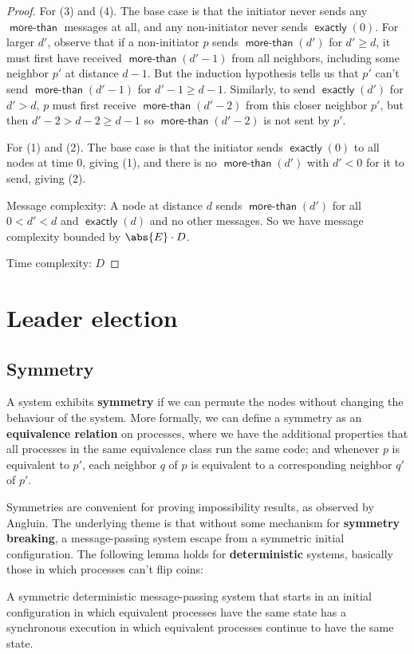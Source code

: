 \documentclass[11pt]{article}
\DeclareMathOperator{\exactly}{\textsf{exactly}}
\DeclareMathOperator{\morethan}{\textsf{more-than}}
\begin{document}
\begin{proof}
For (3) and (4). The base case is that the initiator never sends any \(\morethan\) messages at all,
and any non-initiator never sends \(\exactly(0)\). For larger \(d'\), observe that if a non-initiator
\(p\) sends \(\morethan(d')\) for \(d'\ge d\), it must first have received \(\morethan(d'-1)\) from all
neighbors, including some neighbor \(p'\) at distance \(d-1\). But the induction hypothesis tells us
that \(p'\) can't send \(\morethan(d'-1)\) for \(d'-1\ge d-1\). Similarly, to send \(\exactly(d')\) for
\(d'>d\), \(p\) must first receive \(\morethan(d'-2)\) from this closer neighbor \(p'\), but then
\(d'-2>d-2\ge d-1\) so \(\morethan(d'-2)\) is not sent by \(p'\).

For (1) and (2). The base case is that the initiator sends \(\exactly(0)\) to all nodes at time 0,
giving (1), and there is no \(\morethan(d')\) with \(d'<0\) for it to send, giving (2).

Message complexity: A node at distance \(d\) sends \(\morethan(d')\) for all \(0<d'<d\) and
\(\exactly(d)\) and no other messages. So we have message complexity bounded by \(\abs{E}\cdot D\).

Time complexity: \(D\)
\end{proof}
\section{Leader election}
\label{sec:org88cf5e1}
\subsection{Symmetry}
\label{sec:org5b6d3dc}
A system exhibits \textbf{symmetry} if we can permute the nodes without changing the behaviour of the system.
More formally, we can define a symmetry as an \textbf{equivalence relation} on processes, where we have the
additional properties that all processes in the same equivalence class run the same code; and whenever
\(p\) is equivalent to \(p'\), each neighbor \(q\) of \(p\) is equivalent to a corresponding neighbor
\(q'\) of \(p'\).

Symmetries are convenient for proving impossibility results, as observed by Angluin. The underlying
theme is that without some mechanism for  \textbf{symmetry breaking}, a message-passing system escape from a
symmetric initial configuration. The following lemma holds for \textbf{deterministic} systems, basically those
in which processes can’t flip coins:
\begin{lemma}[]
\label{5.1.1}
    A symmetric deterministic message-passing system that starts in an initial configuration in which
    equivalent processes have the same state has a synchronous execution in which equivalent processes
    continue to have the same state.
\end{lemma}
\end{document}
